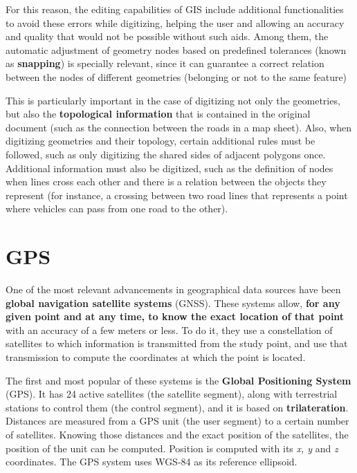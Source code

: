 For this reason, the editing capabilities of GIS include additional functionalities to avoid these errors while digitizing, helping the user and allowing an accuracy and quality that would not be possible without such aids. Among them, the automatic adjustment of geometry nodes based on predefined tolerances (known as \textbf{snapping}) is specially relevant, since it can guarantee a correct relation between the nodes of different geometries (belonging or not to the same feature)

This is particularly important in the case of digitizing not only the geometries, but also the \textbf{topological information} that is contained in the original document (such as the connection between the roads in a map sheet).  Also, when digitizing geometries and their topology, certain additional rules must be followed, such as only digitizing the shared sides of adjacent polygons once. Additional information must also be digitized, such as the definition of nodes when lines cross each other and there is a relation between the objects they represent (for instance, a crossing between two road lines that represents a point where vehicles can pass from one road to the other).

\section{GPS}

One of the most relevant advancements in geographical data sources have been \textbf{global navigation satellite systems} (GNSS). These systems allow, \textbf{for any given point and at any time, to know the exact location of that point} with an accuracy of a few meters or less. To do it, they use a constellation of satellites to which information is transmitted from the study point, and use that transmission to compute the coordinates at which the point is located.

The first and most popular of these systems is the \textbf{Global Positioning System} (GPS). It has 24 active satellites (the satellite segment), along with terrestrial stations to control them (the control segment), and it is based on \textbf{trilateration}. Distances are measured from a GPS unit (the user segment) to a certain number of satellites. Knowing those distances and the exact position of the satellites, the position of the unit can be computed. Position is computed with its \emph{x, y} and \emph{z} coordinates. The GPS system uses WGS-84 as its reference ellipsoid.

